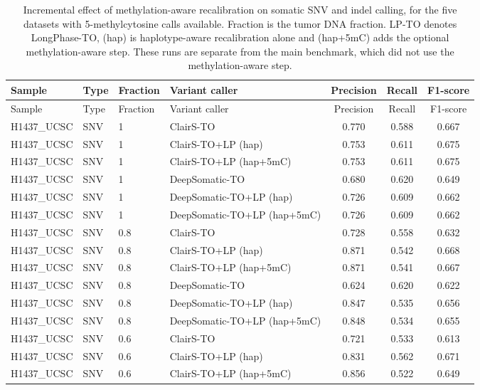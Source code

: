 \documentclass[pdflatex,sn-nature]{sn-jnl}
\begin{document}
\FloatBarrier
{\footnotesize
\begin{longtable}{@{}llllccc@{}}
  \caption[Incremental effect of methylation-aware recalibration]%
  {Incremental effect of methylation-aware recalibration on somatic SNV and indel
  calling, for the five datasets with 5-methylcytosine calls available. Fraction is the
  tumor DNA fraction. LP-TO denotes LongPhase-TO, (hap) is haplotype-aware
  recalibration alone and (hap+5mC) adds the optional methylation-aware step. These runs are
  separate from the main benchmark, which did not use the methylation-aware step.}
  \label{tab:methylation_recalibration}\\
  \toprule
  Sample & Type & Fraction & Variant caller & Precision & Recall & F1-score \\
  \midrule
  \endfirsthead
  \toprule
  Sample & Type & Fraction & Variant caller & Precision & Recall & F1-score \\
  \midrule
  \endhead
  \bottomrule
  \endlastfoot
  H1437\_UCSC & SNV & 1 & ClairS-TO & 0.770 & 0.588 & 0.667 \\
  H1437\_UCSC & SNV & 1 & ClairS-TO+LP (hap) & 0.753 & 0.611 & 0.675 \\
  H1437\_UCSC & SNV & 1 & ClairS-TO+LP (hap+5mC) & 0.753 & 0.611 & 0.675 \\
  H1437\_UCSC & SNV & 1 & DeepSomatic-TO & 0.680 & 0.620 & 0.649 \\
  H1437\_UCSC & SNV & 1 & DeepSomatic-TO+LP (hap) & 0.726 & 0.609 & 0.662 \\
  H1437\_UCSC & SNV & 1 & DeepSomatic-TO+LP (hap+5mC) & 0.726 & 0.609 & 0.662 \\
  H1437\_UCSC & SNV & 0.8 & ClairS-TO & 0.728 & 0.558 & 0.632 \\
  H1437\_UCSC & SNV & 0.8 & ClairS-TO+LP (hap) & 0.871 & 0.542 & 0.668 \\
  H1437\_UCSC & SNV & 0.8 & ClairS-TO+LP (hap+5mC) & 0.871 & 0.541 & 0.667 \\
  H1437\_UCSC & SNV & 0.8 & DeepSomatic-TO & 0.624 & 0.620 & 0.622 \\
  H1437\_UCSC & SNV & 0.8 & DeepSomatic-TO+LP (hap) & 0.847 & 0.535 & 0.656 \\
  H1437\_UCSC & SNV & 0.8 & DeepSomatic-TO+LP (hap+5mC) & 0.848 & 0.534 & 0.655 \\
  H1437\_UCSC & SNV & 0.6 & ClairS-TO & 0.721 & 0.533 & 0.613 \\
  H1437\_UCSC & SNV & 0.6 & ClairS-TO+LP (hap) & 0.831 & 0.562 & 0.671 \\
  H1437\_UCSC & SNV & 0.6 & ClairS-TO+LP (hap+5mC) & 0.856 & 0.522 & 0.649 \\

\end{longtable}}
\end{document}
